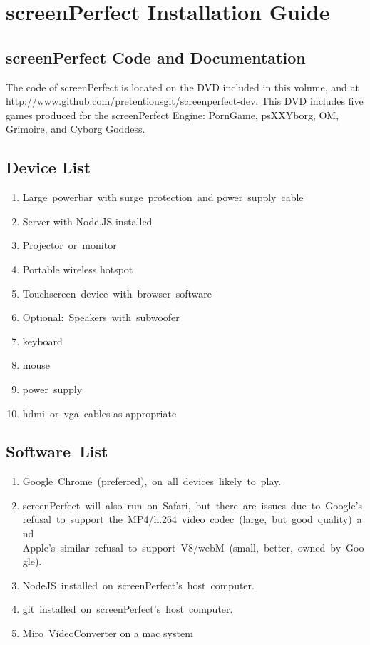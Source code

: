 \chapter{screenPerfect Installation Guide} %

\label{AppendixA} %

\section{screenPerfect Code and Documentation}
The code of screenPerfect is located on the DVD included in this volume, and at \url{http://www.github.com/pretentiousgit/screenperfect-dev}. This DVD includes five games produced for the screenPerfect Engine: PornGame, psXXYborg, OM, Grimoire, and Cyborg Goddess.

\section{Device List}

\begin{enumerate}
\item{Large powerbar with surge protection and power supply cable}
\item{Server with Node.JS installed}
\item{Projector or monitor}
\item{Portable wireless hotspot}
\item{Touchscreen device with browser software}
\item{Optional: Speakers with subwoofer}
\item{keyboard}
\item{mouse}
\item{power supply}
\item{hdmi or vga cables as appropriate}
\end{enumerate}

\section{Software List}
\begin{enumerate}
\item{Google Chrome (preferred), on all devices likely to play.}
\item{screenPerfect will also run on Safari, but there are issues due to Google’s refusal to support the MP4/h.264 video codec (large, but good quality) and Apple’s similar refusal to support V8/webM (small, better, owned by Google).}
\item{NodeJS installed on screenPerfect’s host computer.}
\item{git installed on screenPerfect’s host computer.}
\item{Miro VideoConverter on a mac system}
\end{enumerate}


